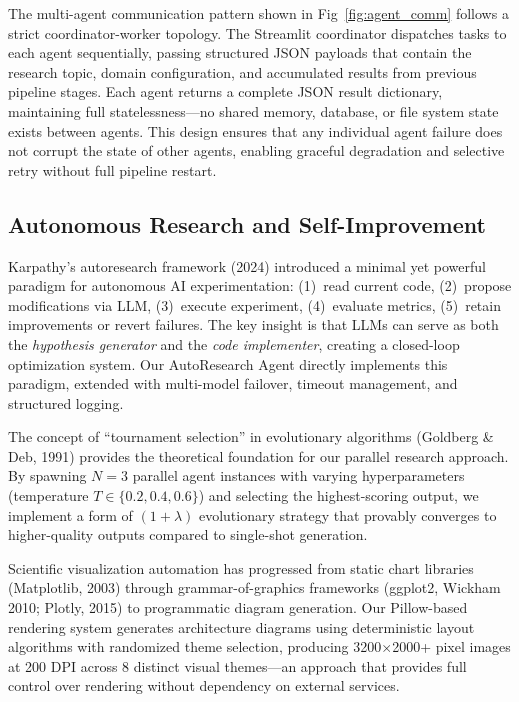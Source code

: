 \documentclass[a4paper,12pt,openany]{report}
\begin{document}
The multi-agent communication pattern shown in Fig~\ref{fig:agent_comm} follows a strict coordinator-worker topology. The Streamlit coordinator dispatches tasks to each agent sequentially, passing structured JSON payloads that contain the research topic, domain configuration, and accumulated results from previous pipeline stages. Each agent returns a complete JSON result dictionary, maintaining full statelessness---no shared memory, database, or file system state exists between agents. This design ensures that any individual agent failure does not corrupt the state of other agents, enabling graceful degradation and selective retry without full pipeline restart.

\subsection{Autonomous Research and Self-Improvement}

Karpathy's autoresearch framework (2024) introduced a minimal yet powerful paradigm for autonomous AI experimentation: (1)~read current code, (2)~propose modifications via LLM, (3)~execute experiment, (4)~evaluate metrics, (5)~retain improvements or revert failures. The key insight is that LLMs can serve as both the \textit{hypothesis generator} and the \textit{code implementer}, creating a closed-loop optimization system. Our AutoResearch Agent directly implements this paradigm, extended with multi-model failover, timeout management, and structured logging.

The concept of ``tournament selection'' in evolutionary algorithms (Goldberg \& Deb, 1991) provides the theoretical foundation for our parallel research approach. By spawning $N=3$ parallel agent instances with varying hyperparameters (temperature $T \in \{0.2, 0.4, 0.6\}$) and selecting the highest-scoring output, we implement a form of $(1+\lambda)$ evolutionary strategy that provably converges to higher-quality outputs compared to single-shot generation.

Scientific visualization automation has progressed from static chart libraries (Matplotlib, 2003) through grammar-of-graphics frameworks (ggplot2, Wickham 2010; Plotly, 2015) to programmatic diagram generation. Our Pillow-based rendering system generates architecture diagrams using deterministic layout algorithms with randomized theme selection, producing 3200$\times$2000+ pixel images at 200 DPI across 8 distinct visual themes---an approach that provides full control over rendering without dependency on external services.
\end{document}
